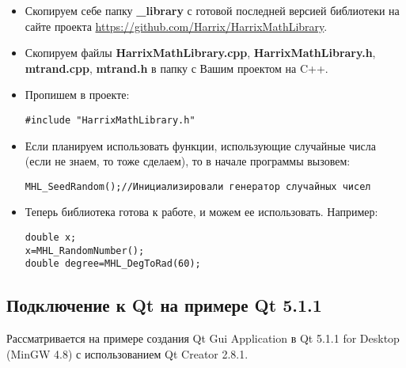 \documentclass[a4paper,12pt]{article}
\begin{document}
\begin{itemize}
\item Скопируем себе папку \textbf{\_library} с готовой последней версией библиотеки на сайте проекта \href{https://github.com/Harrix/HarrixMathLibrary}{https://github.com/Harrix/HarrixMathLibrary}.

\item Скопируем файлы \textbf{HarrixMathLibrary.cpp}, \textbf{HarrixMathLibrary.h}, \textbf{mtrand.cpp}, \textbf{mtrand.h} в папку с Вашим проектом на C++.

\item Пропишем в проекте:
\begin{lstlisting}[label=install_01,caption=Подключение библиотеки]
#include "HarrixMathLibrary.h"
\end{lstlisting}

\item Если планируем использовать функции, использующие случайные числа (если не знаем, то тоже сделаем), то в начале программы вызовем:
\begin{lstlisting}[label=install_02,caption=Инициализация генератора случайных чисел]
MHL_SeedRandom();//Инициализировали генератор случайных чисел
\end{lstlisting}

\item Теперь библиотека готова к работе, и можем ее использовать. Например:
\begin{lstlisting}[label=install_03,caption=Пример использования]
double x;
x=MHL_RandomNumber();
double degree=MHL_DegToRad(60);
\end{lstlisting}
\end{itemize}


\subsection{Подключение к Qt на примере Qt 5.1.1}

Рассматривается на примере создания Qt Gui Application в Qt 5.1.1 for Desktop (MinGW 4.8) с использованием Qt Creator 2.8.1.
\end{document}
